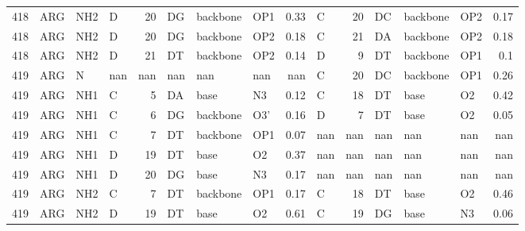 \begin{longtable}{rlllrlllrlrlllr}
       418 & ARG        & NH2    & D         &          20 & DG           & backbone    & OP1      &          0.33 & C         &          20 & DC           & backbone    & OP2      &          0.17 \\
       418 & ARG        & NH2    & D         &          20 & DG           & backbone    & OP2      &          0.18 & C         &          21 & DA           & backbone    & OP2      &          0.18 \\
       418 & ARG        & NH2    & D         &          21 & DT           & backbone    & OP2      &          0.14 & D         &           9 & DT           & backbone    & OP1      &          0.1  \\
       419 & ARG        & N      & nan       &         nan & nan          & nan         & nan      &        nan    & C         &          20 & DC           & backbone    & OP1      &          0.26 \\
       419 & ARG        & NH1    & C         &           5 & DA           & base        & N3       &          0.12 & C         &          18 & DT           & base        & O2       &          0.42 \\
       419 & ARG        & NH1    & C         &           6 & DG           & backbone    & O3'      &          0.16 & D         &           7 & DT           & base        & O2       &          0.05 \\
       419 & ARG        & NH1    & C         &           7 & DT           & backbone    & OP1      &          0.07 & nan       &         nan & nan          & nan         & nan      &        nan    \\
       419 & ARG        & NH1    & D         &          19 & DT           & base        & O2       &          0.37 & nan       &         nan & nan          & nan         & nan      &        nan    \\
       419 & ARG        & NH1    & D         &          20 & DG           & base        & N3       &          0.17 & nan       &         nan & nan          & nan         & nan      &        nan    \\
       419 & ARG        & NH2    & C         &           7 & DT           & backbone    & OP1      &          0.17 & C         &          18 & DT           & base        & O2       &          0.46 \\
       419 & ARG        & NH2    & D         &          19 & DT           & base        & O2       &          0.61 & C         &          19 & DG           & base        & N3       &          0.06 \\

\end{longtable}
